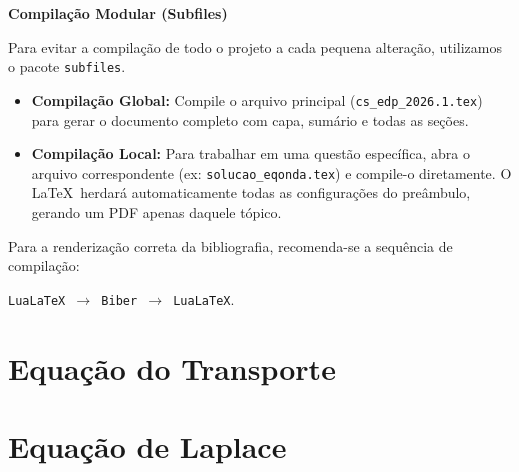 \documentclass[10pt,a4paper]{article}
\begin{document}
	\begin{tcolorbox}[
		enhanced, 
		sharp corners, 
		boxrule=0.5pt, 
		colback=white, 
		colframe=gray!40, %
		left=10pt, right=10pt, top=10pt, bottom=10pt
		]
		\textbf{Compilação Modular (Subfiles)}
		
		\vspace{0.2cm}
		Para evitar a compilação de todo o projeto a cada pequena alteração, utilizamos o pacote \texttt{subfiles}. 
		\begin{itemize}
			\item \textbf{Compilação Global:} Compile o arquivo principal (\texttt{cs\_edp\_2026.1.tex}) para gerar o documento completo com capa, sumário e todas as seções.
			\item \textbf{Compilação Local:} Para trabalhar em uma questão específica, abra o arquivo correspondente (ex: \texttt{solucao\_eqonda.tex}) e compile-o diretamente. O \LaTeX\ herdará automaticamente todas as configurações do preâmbulo, gerando um PDF apenas daquele tópico.
		\end{itemize}
	\end{tcolorbox}
	
	\vspace{0.3cm}
	Para a renderização correta da bibliografia, recomenda-se a sequência de compilação: 
	\begin{center}
		\texttt{LuaLaTeX $\to$ Biber $\to$ LuaLaTeX}.
	\end{center}
	
	\newpage
	
	\tableofcontents
	\newpage
	
	
	\section{Equação do Transporte}
	\def\listid{L1} 
	\setcounter{numquestao}{0} 
	
	
	\section{Equação de Laplace}
	\def\listid{L2} 
	\setcounter{numquestao}{3} 
	
	
\end{document}
